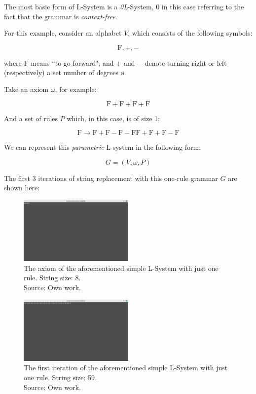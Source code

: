 The most basic form of L-System is a \emph{0L}-System, 0 in this case referring to the fact that the grammar is \emph{context-free}.

For this example\cite{lsyspaulbourke}, consider an alphabet $V$, which consists of the following symbols:

\newcommand{\F}{\mbox{F}}

$$ \F, +, - $$

where $\F$ means ``to go forward", and $+$ and $-$ denote turning right or left (respectively) a set number of degrees \o.

Take an axiom $\omega$, for example:

$$ \F+\F+\F+\F $$

And a set of rules $P$ which, in this case, is of size 1:

$$ \F \rightarrow \F+\F-\F-\F\F+\F+\F-\F $$

We can represent this \emph{parametric} L-system in the following form:\cite{enwiki:1124510226}

$$ G = (V, \omega, P) $$

The first 3 iterations of string replacement with this one-rule grammar $G$ are shown here:

\begin{figure}[H]
	\centering
	\includegraphics[width=0.5\textwidth]{Images/initial-l-system-iteration-0.png}
	\caption{The axiom of the aforementioned simple L-System with just one rule. String size: 8.\\Source: Own work.}
	\label{fig:lsysiter0}
\end{figure}

\begin{figure}[H]
	\centering
	\includegraphics[width=0.5\textwidth]{Images/initial-l-system-iteration-1.png}
	\caption{The first iteration of the aforementioned simple L-System with just one rule. String size: 59.\\Source: Own work.}
	\label{fig:lsysiter1}
\end{figure}

